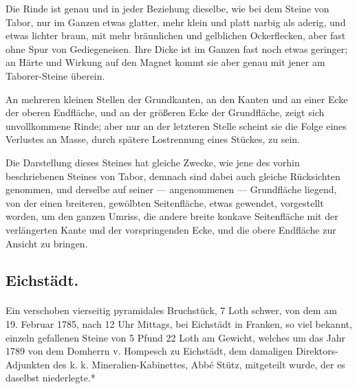 \documentclass[a4paper, 11pt, oneside, german]{article}
\begin{document}
Die Rinde ist genau und in jeder Beziehung dieselbe, wie bei dem Steine von Tabor, nur im Ganzen etwas glatter, mehr klein und platt narbig als aderig, und etwas lichter braun, mit mehr bräunlichen und gelblichen Ockerflecken, aber fast ohne Spur von Gediegeneisen. Ihre Dicke ist im Ganzen fast noch etwas geringer; an Härte und Wirkung auf den Magnet kommt sie aber genau mit jener am Taborer-Steine überein.

An mehreren kleinen Stellen der Grundkanten, an den Kanten und an einer Ecke der oberen Endfläche, und an der größeren Ecke der Grundfläche, zeigt sich unvollkommene Rinde; aber nur an der letzteren Stelle scheint sie die Folge eines Verlustes an Masse, durch spätere Lostrennung eines Stückes, zu sein.

Die Darstellung dieses Steines hat gleiche Zwecke, wie jene des vorhin beschriebenen Steines von Tabor, demnach sind dabei auch gleiche Rücksichten genommen, und derselbe auf seiner --- angenommenen --- Grundfläche liegend, von der einen breiteren, gewölbten Seitenfläche, etwas gewendet, vorgestellt worden, um den ganzen Umriss, die andere breite konkave Seitenfläche mit der verlängerten Kante und der vorspringenden Ecke, und die obere Endfläche zur Ansicht zu bringen.

\subsection{Eichstädt.}
\paragraph{}
Ein verschoben vierseitig pyramidales Bruchstück, 7 Loth schwer, von dem am 19. Februar 1785, nach 12 Uhr Mittags, bei Eichstädt in Franken, so viel bekannt, einzeln gefallenen Steine von 5 Pfund 22 Loth am Gewicht, welches um das Jahr 1789 von dem Domherrn v. Hompesch zu Eichstädt, dem damaligen Direktors-Adjunkten des k. k. Mineralien-Kabinettes, Abbé Stütz, mitgeteilt wurde, der es daselbst niederlegte.*
\end{document}
